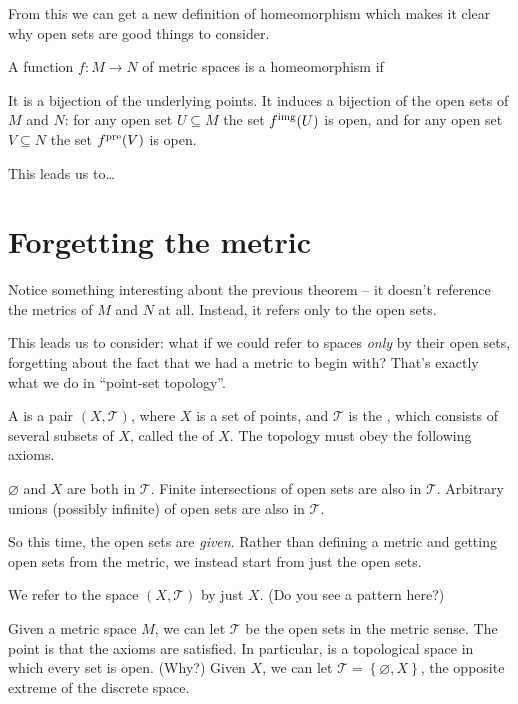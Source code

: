 From this we can get a new definition of homeomorphism
which makes it clear why open sets are good things to consider.
\begin{theorem}
	A function $f : M \to N$ of metric spaces is a homeomorphism if
	\begin{enumerate}[(i)]
		\ii It is a bijection of the underlying points.
		\ii It induces a bijection of the open sets of $M$ and $N$:
		for any open set $U \subseteq M$ the set $f^{\text{img}}(U)$ is open,
		and for any open set $V \subseteq N$ the set $f^{\text{pre}}(V)$ is open.
	\end{enumerate}
\end{theorem}

This leads us to\dots

\section{Forgetting the metric}
Notice something interesting about the previous theorem --
it doesn't reference the metrics of $M$ and $N$ at all.
Instead, it refers only to the open sets.

This leads us to consider:
what if we could refer to spaces \emph{only} by their open sets,
forgetting about the fact that we had a metric to begin with?
That's exactly what we do in ``point-set topology''.

\begin{definition}
	A  is a pair $(X, \mathcal T)$,
	where $X$ is a set of points,
	and $\mathcal T$ is the , which consists of several subsets of $X$, called the  of $X$.
	The topology must obey the following axioms.
	\begin{itemize}
		\ii $\varnothing$ and $X$ are both in $\mathcal T$.
		\ii Finite intersections of open sets are also in $\mathcal T$.
		\ii Arbitrary unions (possibly infinite) of open sets are also in $\mathcal T$.
	\end{itemize}
\end{definition}
So this time, the open sets are \emph{given}.
Rather than defining a metric and getting open sets from the metric,
we instead start from just the open sets.
\begin{abuse}
	We refer to the space $(X, \mathcal T)$ by just $X$.
	(Do you see a pattern here?)
\end{abuse}

\begin{example}
	\listhack
	\begin{enumerate}[(a)]
		\ii Given a metric space $M$, we can let $\mathcal T$ be
		the open sets in the metric sense.
		The point is that the axioms are satisfied.
		\ii In particular,  is a topological space in which every set is open. (Why?)
		\ii Given $X$, we can let $\mathcal T = \left\{ \varnothing, X \right\}$,
		the opposite extreme of the discrete space.
	\end{enumerate}
\end{example}

